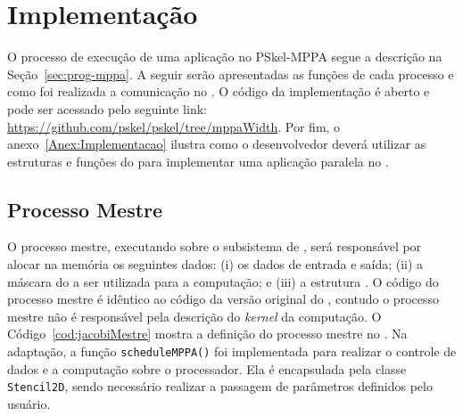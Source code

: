 

%

\section{Implementação}
O processo de execução de uma aplicação no PSkel-MPPA segue a descrição na
Seção~\ref{sec:prog-mppa}. A seguir serão apresentadas as funções de cada
processo e como foi realizada a comunicação no \mppa. O código da implementação
é aberto e pode ser acessado pelo seguinte link:
\url{https://github.com/pskel/pskel/tree/mppaWidth}. Por fim, o
anexo~\ref{Anex:Implementacao} ilustra como o desenvolvedor deverá utilizar as
estruturas e funções do \fw \pskel para implementar uma aplicação paralela no
\mppa.

\subsection{Processo Mestre}
O processo mestre, executando sobre o subsistema de \es, será responsável por
alocar na memória \lpddr os seguintes dados: (i) os dados de entrada e saída; (ii) a máscara do \stencil a ser utilizada para a computação; e
(iii) a estrutura \stencil. O código do processo mestre é idêntico ao código da versão
original do \pskel, contudo o processo mestre não é responsável pela descrição
do \textit{kernel} da computação. O Código~\ref{cod:jacobiMestre} mostra a
definição do processo mestre no \mppa.  Na adaptação, a função
\texttt{scheduleMPPA()} foi implementada para realizar o controle de dados e a
computação sobre o processador. Ela é encapsulada pela classe
\texttt{Stencil2D}, sendo necessário realizar a passagem de parâmetros definidos
pelo usuário.

